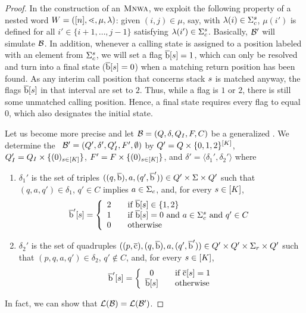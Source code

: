 \documentclass{LMCS}
\begin{document}
\begin{proof}
  In the construction of an $\textsc{Mnwa}$, we exploit the following property of a
  nested word $W=([n],\mathord{\lessdot},\mu,\lambda)$: given $(i,j) \in \mu$, say,
  with $\lambda(i) \in \Sigma_c^s$, $\mu(i')$ is defined for all $i' \in
  \{i+1,\ldots,j-1\}$ satisfying $\lambda(i') \in \Sigma_c^s$. Basically,
  $\mathcal{B}'$ will simulate $\mathcal{B}$. In addition, whenever a calling state is
  assigned to a position labeled with an element from $\Sigma_c^s$, we
  will set a flag $\overline{\textup{b}}[s]=1$, which can only be
  resolved and turn into a final state ($\overline{\textup{b}}[s]=0$)
  when a matching return position has been found. As any interim call position
  that concerns stack $s$ is matched anyway, the flags
  $\overline{\textup{b}}[s]$ in that interval are set to $2$. Thus, while
  a flag is $1$ or $2$, there is still some unmatched calling position. Hence,
  a final state requires every flag to equal $0$, which also designates the
  initial state.

  Let us become more precise and let $\mathcal{B}=(Q,\delta,Q_I,F,C)$ be a
  generalized \MNWA. We determine the
  \MNWA~$\mathcal{B}'=(Q',\delta',Q_I',F',\emptyset)$ by $Q' = Q \times
  \{0,1,2\}^{[K]}$, $Q_I' = Q_I \times \{(0)_{s \in
    [K]}\}$, $F' = F \times \{(0)_{s \in [K]}\}$, and
  $\delta' = \langle \delta_1' , \delta_2' \rangle$ where
  \begin{enumerate}[$\bullet$]
  \item $\delta_1'$ is the set of triples
    $((q,\overline{\textup{b}}),a,(q',\overline{\textup{b}}')) \in Q' \times \Sigma \times Q'$
    such that $(q,a,q') \in \delta_1$, $q'\in C$ implies $a \in \Sigma_c$, and,
    for every $s \in [K]$,
  \[\overline{\textup{b}}'[s] = \left\{
    \begin{array}{cl}
      2 & ~~ \text{~if~} \overline{\textup{b}}[s] \in \{1,2\}\\
      1 & ~~ \text{~if~} \overline{\textup{b}}[s]  = 0 \text{~and~} a \in \Sigma_c^s
      \text{~and~} q' \in C\\
      0 & ~~ \text{~otherwise}
 \end{array}
\right.
\]
\item $\delta_2'$ is the set of quadruples
  $((p,\overline{\textup{c}}),(q,\overline{\textup{b}}),a,(q',\overline{\textup{b}}'))
  \in Q' \times Q' \times \Sigma_r \times Q'$ such that $(p,q,a,q') \in
  \delta_2$, $q' \not\in C$, and, for every $s \in [K]$,
  \[\overline{\textup{b}}'[s] = \left\{
    \begin{array}{cl}
      0 & ~~ \text{~if~} \overline{\textup{c}}[s]  = 1\\
      \overline{\textup{b}}[s] & ~~ \text{~otherwise}
 \end{array}
\right.
\]
\end{enumerate}
In fact, we can show that $\mathcal{L}(\mathcal{B}) = \mathcal{L}(\mathcal{B}')$.




\end{proof}
\end{document}

